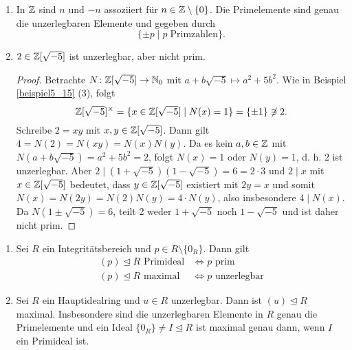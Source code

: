 \begin{beispiel}\label{beispiel6_8}
	\begin{enumerate}[label=(\arabic*)]
		\item In $\mathbb{Z}$ sind $n$ und $-n$ assoziiert für $n \in \mathbb{Z} \setminus \{0\}$. Die Primelemente sind genau die unzerlegbaren Elemente und gegeben durch
		\[\{\pm p \mid p \;\text{Primzahlen}\}.\]
		\item $2 \in \mathbb{Z}[\sqrt{-5}]$ ist unzerlegbar, aber nicht prim.
		\begin{proof}
			Betrachte $N \colon \mathbb{Z}[\sqrt{-5}] \to \mathbb{N}_0$ mit $a+b\sqrt{-5} \mapsto a^2 + 5b^2$. Wie in Beispiel \ref{beispiel5_15} (3), folgt
			\[\mathbb{Z}[\sqrt{-5}]^\times = \{x \in \mathbb{Z}[\sqrt{-5}] \mid N(x) = 1\} = \{\pm 1\} \not\ni 2.\]
			Schreibe $2 = xy$ mit $x,y \in \mathbb{Z}[\sqrt{-5}]$. Dann gilt $4 = N(2) = N(xy) = N(x)N(y)$. Da es kein $a,b \in \mathbb{Z}$ mit $N(a+b\sqrt{-5}) = a^2 + 5b^2 = 2$, folgt $N(x) = 1$ oder $N(y) = 1$, d. h. 2 ist unzerlegbar. Aber $2 \mid (1 + \sqrt{-5})(1 - \sqrt{-5}) = 6 = 2 \cdot 3$ und $2 \mid x$ mit $x \in \mathbb{Z}[\sqrt{-5}]$ bedeutet, dass $y \in \mathbb{Z}[\sqrt{-5}]$ existiert mit $2y = x$ und somit $N(x) = N(2y) = N(2) N(y) = 4 \cdot N(y)$, also insbesondere $4 \mid N(x)$. Da $N(1 \pm \sqrt{-5}) = 6$, teilt 2 weder $1 + \sqrt{-5}$ noch $1 - \sqrt{-5}$ und ist daher nicht prim.
		\end{proof}
	\end{enumerate}
\end{beispiel}
\begin{prop}\label{prop6_9}
\begin{enumerate}[label=(\alph*)]
	\item 	Sei $R$ ein Integritätsbereich und $p \in R \setminus \{0_R\}$. Dann gilt
	\begin{align*}
		(p) \unlhd R \text{ Primideal} &\Leftrightarrow p \text{ prim}\\
		(p) \unlhd R \text{ maximal} &\Leftrightarrow p \text{ unzerlegbar}
	\end{align*}
	\item Sei $R$ ein Hauptidealring und $u \in R$ unzerlegbar. Dann ist $(u) \unlhd R$ maximal. Insbesondere sind die unzerlegbaren Elemente in $R$ genau die Primelemente und ein Ideal $\{0_R\} \neq I \unlhd R$ ist maximal genau dann, wenn $I$ ein Primideal ist.
\end{enumerate}	
\end{prop}
